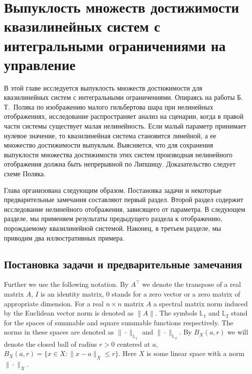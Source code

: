 \documentclass[../main.tex]{subfiles}
\begin{document}
\clearpage
\section{Выпуклость множеств достижимости квазилинейных систем с интегральными ограничениями на управление}
В этой главе исследуется выпуклость множеств достижимости для квазилинейных систем с интегральными ограничениями.  
Опираясь на работы Б.\,Т.~Поляка \cite{Polyak2001,Polyak2004} по изображению малого гильбертова шара при нелинейных отображениях, исследование распространяет анализ на сценарии, когда в правой части системы существует малая нелинейность. 
Если малый параметр принимает нулевое значение, то квазилинейная система становится линейной, а ее множество достижимости выпуклым. 
Выясняется, что для сохранения выпуклости множества достижимости этих систем производная нелинейного отображения должна быть непрерывной по Липшицу. Доказательство следует схеме Поляка.  

Глава организована следующим образом. 
Постановка задачи и некоторые предварительные замечания составляют первый раздел. 
Второй раздел содержит исследование нелинейного отображения, зависящего от параметра.  
В следующем разделе, мы применяем результаты предыдущего раздела к отображению, порождаемому квазилинейной системой. 
Наконец, в третьем разделе, мы приводим два иллюстративных примера.

\subsection{Постановка задачи и предварительные замечания}

Further we use the following notation. By $A^{\top}$ we denote the transpose of a real matrix $A$, $I$ is an identity matrix, $0$ stands for a zero vector or a zero matrix of appropriate dimension. 
For a real $n \times n$ matrix $A$ a spectral matrix norm induced by the Euclidean vector norm is denoted as $\|A\|$.
The symbols $\mathbb{L}_1$ and $\mathbb{L}_2$ stand for the spaces of summable and square summable functions respectively. The norms in these spaces are denoted as $\|\cdot\|_{\mathbb{L}_1}$ and $\|\cdot\|_{\mathbb{L}_2}$. By $B_X(a,r)$ we will denote the closed ball of radius $r>0$ centered at $a$, $B_X(a, r) = \{x\in X: \|x-a\|_X \leqslant r \}$. Here $X$ is some linear space with a norm $\|\cdot\|_X$.
\end{document}
